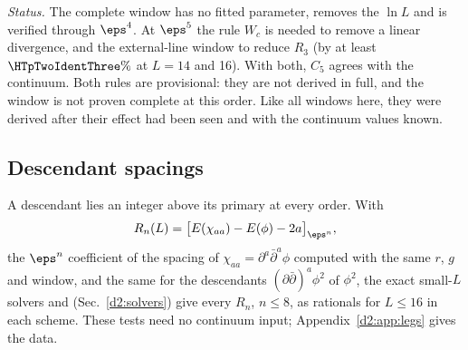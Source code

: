 \emph{Status.} The complete window has no fitted parameter, removes the $\ln L$ and is verified through $\eps^4$. At $\eps^5$
the rule $W_c$ is needed to remove a linear divergence, and the external-line window to reduce $R_3$ (by at least
$\HTpTwoIdentThree\%$ at $L=14$ and 16). With both, $C_5$ agrees with the continuum. Both rules are provisional: they are
not derived in full, and the window is not proven complete at this order. Like all windows here, they were derived after
their effect had been seen and with the continuum values known.

\subsection{Descendant spacings}\label{d2:desc}
A descendant lies an integer above its primary at every order. With
\begin{equation}
 R_n(L)=\big[E(\chi_{aa})-E(\phi)-2a\big]_{\eps^n},
 \label{d2:eq:R}
\end{equation}
the $\eps^n$ coefficient of the spacing of $\chi_{aa}=\partial^a\bar\partial^a\phi$ computed with the same $r$, $g$ and
window, and the same for the descendants $(\partial\bar\partial)^a\phi^2$ of $\phi^2$, the exact small-$L$ solvers
 and  (Sec.~\ref{d2:solvers}) give every $R_n$, $n\le8$, as rationals for $L\le16$ in each
scheme. These tests need no continuum input; Appendix~\ref{d2:app:legs} gives the data.
